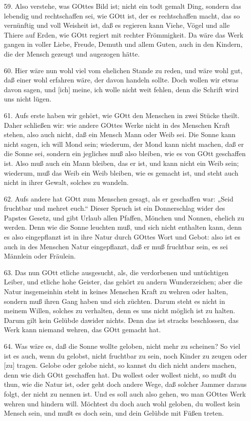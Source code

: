 59. Also verstehe, was GOttes Bild ist; nicht ein todt gemalt Ding, sondern das lebendig und rechtschaffen sei, wie GOtt ist, der es rechtschaffen macht, das so vernünftig und voll Weisheit ist, daß es regieren kann Viehe, Vögel und alle Thiere auf Erden, wie GOtt regiert mit rechter Frömmigkeit. Da wäre das Werk gangen in voller Liebe, Freude, Demuth und allem Guten, auch in den Kindern, die der Mensch gezeugt und augezogen hätte.

60. Hier wäre nun wohl viel vom ehelichen Stande zu reden, und wäre wohl gut, daß einer wohl erfahren wäre, der davon handeln sollte. Doch wollen wir etwas davon sagen, und [ich] meine, ich wolle nicht weit fehlen, denn die Schrift wird uns nicht lügen.

61. Aufs erste haben wir gehört, wie GOtt den Menschen in zwei Stücke theilt. Daher schließen wir: wie andere GOttes Werke nicht in des Menschen Kraft stehen, also auch nicht, daß ein Mensch Mann oder Weib sei. Die Sonne kann nicht sagen, ich will Mond sein; wiederum, der Mond kann nicht machen, daß er die Sonne sei, sondern ein jegliches muß also bleiben, wie es von GOtt geschaffen ist. Also muß auch ein Mann bleiben, das er ist, und kann nicht ein Weib sein; wiederum, muß das Weib ein Weib bleiben, wie es gemacht ist, und steht auch nicht in ihrer Gewalt, solches zu wandeln.

62. Aufs andere hat GOtt zum Menschen gesagt, als er geschaffen war: „Seid fruchtbar und mehret euch.“ Dieser Spruch ist ein Donnerschlag wider des Papstes Gesetz, und gibt Urlaub allen Pfaffen, Mönchen und Nonnen, ehelich zu werden. Denn wie die Sonne leuchten muß, und sich nicht enthalten kann, denn es also eingepflanzt ist in ihre Natur durch GOttes Wort und Gebot: also ist es auch in des Menschen Natur eingepflanzt, daß er muß fruchtbar sein, es sei Männlein oder Fräulein.

63. Das nun GOtt etliche ausgesucht, als, die verdorbenen und untüchtigen Leiber, und etliche hohe Geister, das gehört zu andern Wunderzeichen; aber die Natur insgemeinhin steht in keines Menschen Kraft zu wehren oder halten, sondern muß ihren Gang haben und sich züchten. Darum steht es nicht in meinem Willen, solches zu verhalten, denn es uns nicht möglich ist zu halten. Darum gilt kein Gelübde dawider nichts. Denn das ist stracks beschlossen, das Werk kann niemand wehren, das GOtt gemacht hat.

64. Was wäre es, daß die Sonne wollte geloben, nicht mehr zu scheinen? So viel ist es auch, wenn du gelobst, nicht fruchtbar zu sein, noch Kinder zu zeugen oder [zu] tragen. Gelobe oder gelobe nicht, so kannst du dich nicht anders machen, denn wie dich GOtt geschaffen hat. Du wollest oder wollest nicht, so mußt du thun, wie die Natur ist, oder geht doch andere Wege, daß solcher Jammer daraus folgt, der nicht zu nennen ist. Und es soll auch also gehen, wo man GOttes Werk wehren und hindern will. Möchtest du doch auch wohl geloben, du wollest kein Mensch sein, und mußt es doch sein, und dein Gelübde mit Füßen treten.

